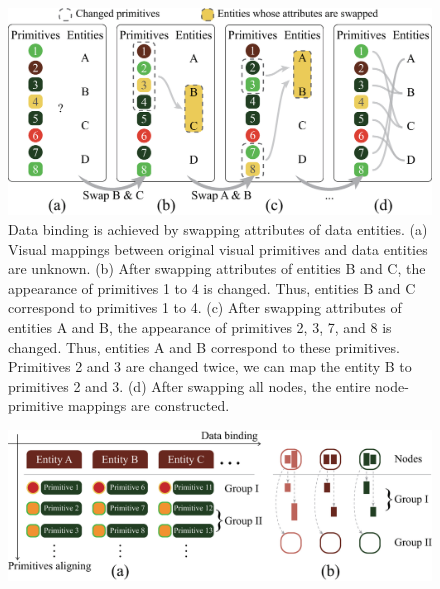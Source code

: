 \begin{figure}
    \centering
    \includegraphics[width=1\columnwidth]{figures/DataBinding.eps}
    \caption{Data binding is achieved by swapping attributes of data entities. (a) Visual mappings between original visual primitives and data entities are unknown. (b) After swapping attributes of entities B and C, the appearance of primitives 1 to 4 is changed. Thus, entities B and C correspond to primitives 1 to 4. (c) After swapping attributes of entities A and B, the appearance of primitives 2, 3, 7, and 8 is changed. Thus, entities A and B correspond to these primitives. Primitives 2 and 3 are changed twice, we can map the entity B to primitives 2 and 3. (d) After swapping all nodes, the entire node-primitive mappings are constructed.}
    \label{fig:DataBinding}
\end{figure}



\begin{figure}
    \centering
    \includegraphics[width=1\columnwidth]{figures/PrimitiveAligning.eps}
    \caption{}
    \label{fig:PrimitiveAligning}
\end{figure}

